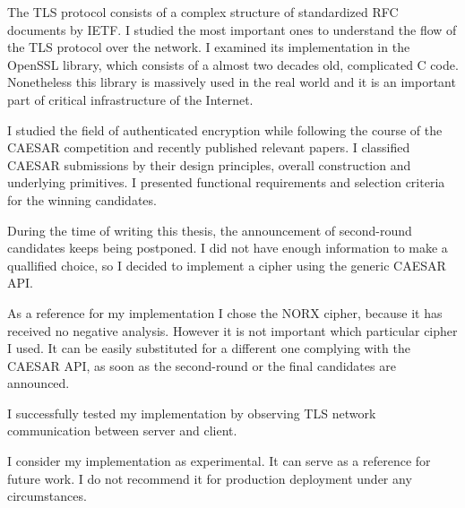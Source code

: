 \begin{conclusion}

The TLS protocol consists of a complex structure of standardized RFC documents by IETF. I studied the most important ones to understand the flow of the TLS protocol over the network. I examined its implementation in the OpenSSL library, which consists of a almost two decades old, complicated C code. Nonetheless this library is massively used in the real world and it is an important part of critical infrastructure of the Internet.

I studied the field of authenticated encryption while following the course of the CAESAR competition and recently published relevant papers. I classified CAESAR submissions by their design principles, overall construction and underlying primitives. I presented functional requirements and selection criteria for the winning candidates.

During the time of writing this thesis, the announcement of second-round candidates keeps being postponed. I did not have enough information to make a quallified choice, so I decided to implement a cipher using the generic CAESAR API.

As a reference for my implementation I chose the NORX cipher, because it has received no negative analysis. However it is not important which particular cipher I used. It can be easily substituted for a different one complying with the CAESAR API, as soon as the second-round or the final candidates are announced.

I successfully tested my implementation by observing TLS network communication between server and client.

I consider my implementation as experimental. It can serve as a reference for future work. I do not recommend it for production deployment under any circumstances.

\end{conclusion}
